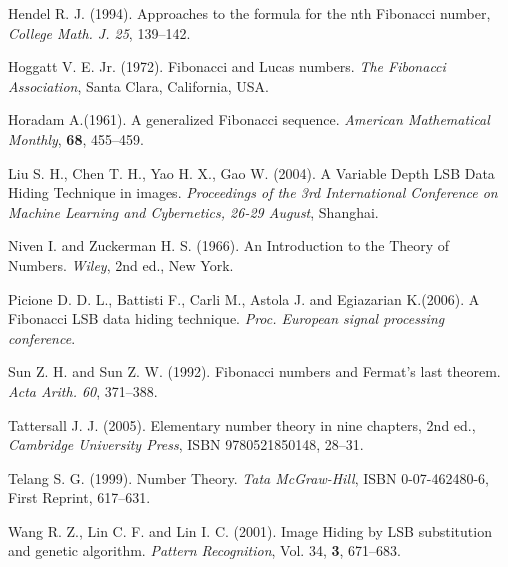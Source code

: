 \documentclass{ijcsa}
\begin{document}
\begin{thebibliography}
Hendel R. J. (1994). Approaches to the formula for the nth Fibonacci number, {\it College Math. J. 25}, 139--142.

Hoggatt V. E. Jr. (1972). Fibonacci and Lucas numbers. {\it The Fibonacci Association}, Santa Clara,
California, USA.

Horadam A.(1961). A generalized Fibonacci sequence. {\it American Mathematical Monthly}, {\bf 68}, 
455--459.

Liu S. H., Chen T. H., Yao H. X., Gao W. (2004). A Variable Depth LSB Data Hiding Technique in images. 
{\it Proceedings of the 3rd International Conference on Machine Learning and Cybernetics, 26-29 August}, Shanghai.

Niven I. and Zuckerman H. S. (1966). An Introduction to the Theory of Numbers. {\it Wiley}, 2nd ed., New York.

Picione D. D. L., Battisti F., Carli M., Astola J. and Egiazarian K.(2006). 
A Fibonacci LSB data hiding technique. {\it Proc. European signal processing conference}.

Sun Z. H. and Sun Z. W. (1992). Fibonacci numbers and Fermat's last theorem. {\it Acta Arith. 60}, 371--388.

Tattersall J. J. (2005). Elementary number theory in nine chapters, 2nd ed., {\it Cambridge University Press}, ISBN 9780521850148, 
28--31.

Telang S. G. (1999). Number Theory. {\it Tata McGraw-Hill}, ISBN 0-07-462480-6, First Reprint, 617--631.

Wang R. Z., Lin C. F. and Lin I. C. (2001). Image Hiding by LSB substitution and genetic algorithm. 
{\it Pattern Recognition}, {Vol. 34}, {\bf 3}, 671--683.

\end{thebibliography}
\end{document}
